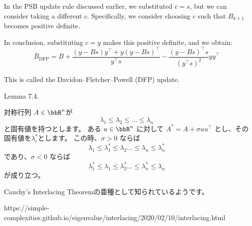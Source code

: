 \documentclass[a4paper, 10pt, dvipdfmx,draft]{article}
\begin{document}
\cite[Section 4.4]{haeltermanAnalyticalStudyLeast2009}




In the PSB update rule discussed earlier, we substituted $c=s$, but we can consider taking a different $c$. Specifically, we consider choosing $c$ such that $B_{k+1}$ becomes positive definite.

In conclusion, substituting $c=y$ makes this positive definite, and we obtain:
\begin{equation}\label{eq:DFP_rank}
    \bar{B}_{\mathrm{DFP}} = B + \frac{(y - Bs)y^\top + y(y - Bs)^\top}{y^\top s} - \frac{(y - Bs)^\top s}{(y^\top s)^2} yy^\top
\end{equation}

This is called the Davidon--Fletcher--Powell (DFP) update.

Lemma 7.4.

対称行列 $A \in \bbR^n$が
$$
    \lambda_1 \leq \lambda_2 \leq \dots \leq \lambda_n
$$
と固有値を持つとします。
ある $u \in \bbR^n$ に対して $A^* = A + \sigma uu^\top$ とし、その固有値を$\lambda_i^*$とします。
この時、$\sigma > 0$ ならば
$$
    \lambda_1 \leq \lambda_1^{*} \leq \lambda_2 \dots \leq \lambda_n \leq \lambda_n^{*}
$$
であり、$\sigma < 0$ ならば
$$
    \lambda_1^{*} \leq \lambda_1 \leq \lambda_2^* \dots \leq \lambda_n^{*} \leq \lambda_n
$$
が成り立つ。

Cauchy's Interlacing Theoremの亜種として知られているようです。

https://simple-complexities.github.io/eigenvalue/interlacing/2020/02/10/interlacing.html
\end{document}

